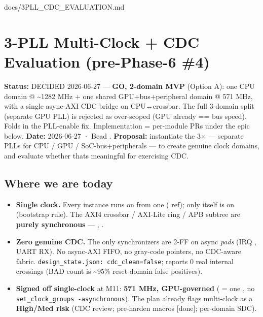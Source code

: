 \begin{relocated}{docs/3PLL_CDC_EVALUATION.md}
\section{3-PLL Multi-Clock + CDC Evaluation (pre-Phase-6 \#4)}\label{tm:dec:3pll-cdc}

\textbf{Status:} DECIDED 2026-06-27 --- \textbf{GO, 2-domain MVP}
(Option A): one CPU domain @ \textasciitilde1282 MHz + one shared
GPU+bus+peripheral domain @ 571 MHz, with a single async-AXI CDC bridge
on CPU↔crossbar. The full 3-domain split (separate GPU PLL) is rejected
as over-scoped (GPU already == bus speed). Folds in the 
PLL-enable fix. Implementation = per-module PRs under the epic below.
\textbf{Date:} 2026-06-27 · Bead .
\textbf{Proposal:} instantiate the  3× --- separate
PLLs for CPU / GPU / SoC-bus+peripherals --- to create genuine clock
domains, and evaluate whether that\textquotesingle s meaningful for
exercising CDC.

\subsection{Where we are today}\label{tm:dec:3pll-cdc:1-where-we-are-today}

\begin{itemize}
\tightlist
\item
  \textbf{Single clock.} Every instance runs on  from one
   ( ref); only 
  itself is on  (bootstrap rule). The AXI4 crossbar /
  AXI-Lite ring / APB subtree are \textbf{purely synchronous} ---
  , .
\item
  \textbf{Zero genuine CDC.} The only synchronizers are 2-FF on async
  \emph{pads} (IRQ , UART RX). No async-AXI FIFO, no
  gray-code pointers, no CDC-aware fabric.
  \texttt{design\_\allowbreak{}state.\allowbreak{}json:\allowbreak{}\ cdc\_\allowbreak{}clean=\allowbreak{}false};
   reports 0 real internal crossings (BAD count is
  \textasciitilde95\% reset-domain false positives).
\item
  \textbf{Signed off single-clock} at M11: \textbf{571 MHz,
  GPU-governed} ( = one
  , no
  \texttt{set\_\allowbreak{}clock\_\allowbreak{}groups\ -\allowbreak{}asynchronous}).
  The plan already flags multi-clock as a \textbf{High/Med risk} (CDC
  review; pre-harden macros {[}done{]}; per-domain SDC).
\end{itemize}


\end{relocated}
